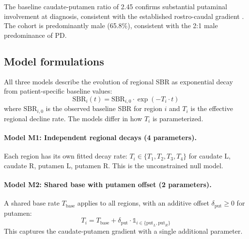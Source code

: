 The baseline caudate-putamen ratio of 2.45 confirms substantial putaminal involvement at diagnosis, consistent with the established rostro-caudal gradient \cite{kish1988}. The cohort is predominantly male (65.8\%), consistent with the 2:1 male predominance of PD.

\subsection{Model formulations}

All three models describe the evolution of regional SBR as exponential decay from patient-specific baseline values:
\begin{equation}
\text{SBR}_i(t) = \text{SBR}_{i,0} \cdot \exp(-T_i \cdot t)
\end{equation}
where $\text{SBR}_{i,0}$ is the observed baseline SBR for region $i$ and $T_i$ is the effective regional decline rate. The models differ in how $T_i$ is parameterized.

\paragraph{Model M1: Independent regional decays (4 parameters).}
Each region has its own fitted decay rate: $T_i \in \{T_1, T_2, T_3, T_4\}$ for caudate L, caudate R, putamen L, putamen R. This is the unconstrained null model.

\paragraph{Model M2: Shared base with putamen offset (2 parameters).}
A shared base rate $T_{\text{base}}$ applies to all regions, with an additive offset $\delta_{\text{put}} \geq 0$ for putamen:
\begin{equation}
T_i = T_{\text{base}} + \delta_{\text{put}} \cdot \mathbb{1}_{i \in \{\text{put}_L, \text{put}_R\}}
\end{equation}
This captures the caudate-putamen gradient with a single additional parameter.

